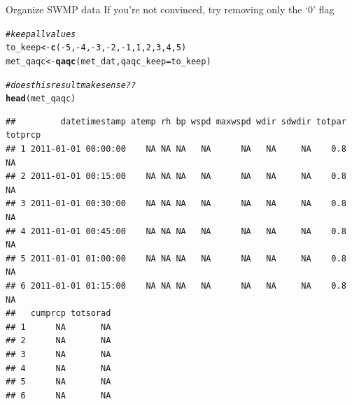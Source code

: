 \documentclass[xcolor=svgnames]{beamer}\usepackage[]{graphicx}\usepackage[]{color}
\makeatletter
\newcommand{\hlnum}[1]{\textcolor[rgb]{0.686,0.059,0.569}{#1}}%
\newcommand{\hlcom}[1]{\textcolor[rgb]{0.678,0.584,0.686}{\textit{#1}}}%
\newcommand{\hlopt}[1]{\textcolor[rgb]{0,0,0}{#1}}%
\newcommand{\hlstd}[1]{\textcolor[rgb]{0.345,0.345,0.345}{#1}}%
\newcommand{\hlkwb}[1]{\textcolor[rgb]{0.69,0.353,0.396}{#1}}%
\newcommand{\hlkwc}[1]{\textcolor[rgb]{0.333,0.667,0.333}{#1}}%
\newcommand{\hlkwd}[1]{\textcolor[rgb]{0.737,0.353,0.396}{\textbf{#1}}}%
\newenvironment{kframe}{%
 \def\at@end@of@kframe{}%
 \ifinner\ifhmode%
  \def\at@end@of@kframe{\end{minipage}}%
  \begin{minipage}{\columnwidth}%
 \fi\fi%
 \def\FrameCommand##1{\hskip\@totalleftmargin \hskip-\fboxsep
 \colorbox{shadecolor}{##1}\hskip-\fboxsep
     \hskip-\linewidth \hskip-\@totalleftmargin \hskip\columnwidth}%
 \MakeFramed {\advance\hsize-\width
   \@totalleftmargin\z@ \linewidth\hsize
   \@setminipage}}%
 {\par\unskip\endMakeFramed%
 \at@end@of@kframe}
\newenvironment{knitrout}{}{} %
\makeatother
\begin{document}
\begin{frame}[containsverbatim]{Organize SWMP data}
If you're not convinced, try removing only the `0' flag
\begin{knitrout}\scriptsize
{}\color{fgcolor}\begin{kframe}
\begin{alltt}
\hlcom{# keep all values}
\hlstd{to_keep} \hlkwb{<-} \hlkwd{c}\hlstd{(}\hlopt{-}\hlnum{5}\hlstd{,} \hlopt{-}\hlnum{4}\hlstd{,} \hlopt{-}\hlnum{3}\hlstd{,} \hlopt{-}\hlnum{2}\hlstd{,} \hlopt{-}\hlnum{1}\hlstd{,} \hlnum{1}\hlstd{,} \hlnum{2}\hlstd{,} \hlnum{3}\hlstd{,} \hlnum{4}\hlstd{,} \hlnum{5}\hlstd{)}
\hlstd{met_qaqc} \hlkwb{<-} \hlkwd{qaqc}\hlstd{(met_dat,} \hlkwc{qaqc_keep} \hlstd{= to_keep)}

\hlcom{# does this result make sense??}
\hlkwd{head}\hlstd{(met_qaqc)}
\end{alltt}
\begin{verbatim}
##         datetimestamp atemp rh bp wspd maxwspd wdir sdwdir totpar totprcp
## 1 2011-01-01 00:00:00    NA NA NA   NA      NA   NA     NA    0.8      NA
## 2 2011-01-01 00:15:00    NA NA NA   NA      NA   NA     NA    0.8      NA
## 3 2011-01-01 00:30:00    NA NA NA   NA      NA   NA     NA    0.8      NA
## 4 2011-01-01 00:45:00    NA NA NA   NA      NA   NA     NA    0.8      NA
## 5 2011-01-01 01:00:00    NA NA NA   NA      NA   NA     NA    0.8      NA
## 6 2011-01-01 01:15:00    NA NA NA   NA      NA   NA     NA    0.8      NA
##   cumprcp totsorad
## 1      NA       NA
## 2      NA       NA
## 3      NA       NA
## 4      NA       NA
## 5      NA       NA
## 6      NA       NA
\end{verbatim}
\end{kframe}
\end{knitrout}
\end{frame}
\end{document}
